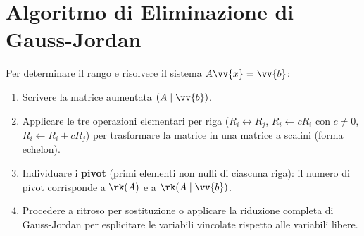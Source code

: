 \section{Algoritmo di Eliminazione di Gauss-Jordan}
\begin{metodo}
Per determinare il rango e risolvere il sistema $A \vv{x} = \vv{b}$:
\begin{enumerate}
    \item Scrivere la matrice aumentata $(A \mid \vv{b})$.
    \item Applicare le tre operazioni elementari per riga ($R_i \leftrightarrow R_j$, $R_i \leftarrow c R_i$ con $c \neq 0$, $R_i \leftarrow R_i + c R_j$) per trasformare la matrice in una matrice a scalini (forma echelon).
    \item Individuare i \textbf{pivot} (primi elementi non nulli di ciascuna riga): il numero di pivot corrisponde a $\rk(A)$ e a $\rk(A \mid \vv{b})$.
    \item Procedere a ritroso per sostituzione o applicare la riduzione completa di Gauss-Jordan per esplicitare le variabili vincolate rispetto alle variabili libere.
\end{enumerate}
\end{metodo}
